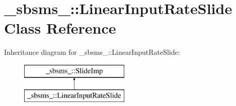 \hypertarget{class__sbsms___1_1_linear_input_rate_slide}{}\section{\+\_\+sbsms\+\_\+\+:\+:Linear\+Input\+Rate\+Slide Class Reference}
\label{class__sbsms___1_1_linear_input_rate_slide}
Inheritance diagram for \+\_\+sbsms\+\_\+\+:\+:Linear\+Input\+Rate\+Slide\+:\begin{figure}[H]
\begin{center}
\leavevmode
\includegraphics[height=2.000000cm]{class__sbsms___1_1_linear_input_rate_slide}
\end{center}
\end{figure}
